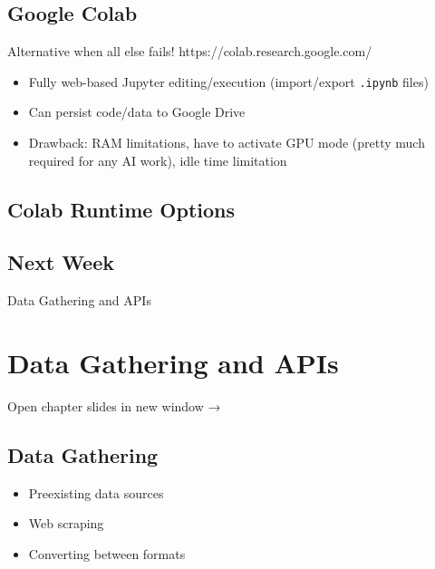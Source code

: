 \documentclass[
  letterpaper,
  DIV=11,
  numbers=noendperiod,
  oneside]{scrreprt}
\providecommand{\tightlist}{%
  \setlength{\itemsep}{0pt}\setlength{\parskip}{0pt}}\usepackage{longtable,booktabs,array}
\begin{document}
\hypertarget{google-colab-1}{%
\section{Google Colab}\label{google-colab-1}}

Alternative when all else fails! https://colab.research.google.com/

\begin{itemize}
\tightlist
\item
  Fully web-based Jupyter editing/execution (import/export
  \texttt{.ipynb} files)
\item
  Can persist code/data to Google Drive
\item
  Drawback: RAM limitations, have to activate GPU mode (pretty much
  required for any AI work), idle time limitation
\end{itemize}

\hypertarget{colab-runtime-options-1}{%
\section{Colab Runtime Options}\label{colab-runtime-options-1}}

\hypertarget{next-week-1}{%
\section{Next Week}\label{next-week-1}}

Data Gathering and APIs

\hypertarget{data-gathering-and-apis}{%
\chapter{Data Gathering and APIs}\label{data-gathering-and-apis}}

Open chapter slides in new window →

\hypertarget{data-gathering}{%
\section{Data Gathering}\label{data-gathering}}

\begin{itemize}
\tightlist
\item
  Preexisting data sources
\item
  Web scraping
\item
  Converting between formats
\end{itemize}
\end{document}
